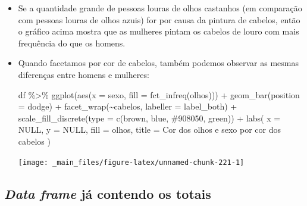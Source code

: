 \documentclass[
  11pt]{report}
\newenvironment{Shaded}{\begin{snugshade}}{\end{snugshade}}
\newcommand{\AttributeTok}[1]{\textcolor[rgb]{0.77,0.63,0.00}{#1}}
\newcommand{\ConstantTok}[1]{\textcolor[rgb]{0.00,0.00,0.00}{#1}}
\newcommand{\FunctionTok}[1]{\textcolor[rgb]{0.00,0.00,0.00}{#1}}
\newcommand{\NormalTok}[1]{#1}
\newcommand{\SpecialCharTok}[1]{\textcolor[rgb]{0.00,0.00,0.00}{#1}}
\newcommand{\StringTok}[1]{\textcolor[rgb]{0.31,0.60,0.02}{#1}}
\renewenvironment{Shaded}{
    \begin{mdframed}[%
      roundcorner=2pt,%
      innerleftmargin=5pt,%
      innerrightmargin=5pt,%
      topline=true,%
      leftline=true,%
      rightline=true,%
      bottomline=true,%
      linewidth=0.5pt,%
      linecolor=black!20,%
      backgroundcolor=black!2,%
      skipabove=2ex,%
      skipbelow=2.5ex%
    ]%
  }
  {
    \end{mdframed}
  }
\begin{document}
\begin{itemize}
\item
  Se a quantidade grande de pessoas louras de olhos castanhos (em comparação com pessoas louras de olhos azuis) for por causa da pintura de cabelos, então o gráfico acima mostra que as mulheres pintam os cabelos de louro com mais frequência do que os homens.
\item
  Quando facetamos por cor de cabelos, também podemos observar as mesmas diferenças entre homens e mulheres:

\begin{Shaded}
\begin{Highlighting}[]
\NormalTok{df }\SpecialCharTok{\%\textgreater{}\%} 
  \FunctionTok{ggplot}\NormalTok{(}\FunctionTok{aes}\NormalTok{(}\AttributeTok{x =}\NormalTok{ sexo, }\AttributeTok{fill =} \FunctionTok{fct\_infreq}\NormalTok{(olhos))) }\SpecialCharTok{+}
    \FunctionTok{geom\_bar}\NormalTok{(}\AttributeTok{position =} \StringTok{\textquotesingle{}dodge\textquotesingle{}}\NormalTok{) }\SpecialCharTok{+}
    \FunctionTok{facet\_wrap}\NormalTok{(}\SpecialCharTok{\textasciitilde{}}\NormalTok{cabelos, }\AttributeTok{labeller =}\NormalTok{ label\_both) }\SpecialCharTok{+}
    \FunctionTok{scale\_fill\_discrete}\NormalTok{(}\AttributeTok{type =} \FunctionTok{c}\NormalTok{(}\StringTok{\textquotesingle{}brown\textquotesingle{}}\NormalTok{, }\StringTok{\textquotesingle{}blue\textquotesingle{}}\NormalTok{, }\StringTok{\textquotesingle{}\#908050\textquotesingle{}}\NormalTok{, }\StringTok{\textquotesingle{}green\textquotesingle{}}\NormalTok{)) }\SpecialCharTok{+}
    \FunctionTok{labs}\NormalTok{(}
      \AttributeTok{x =} \ConstantTok{NULL}\NormalTok{,}
      \AttributeTok{y =} \ConstantTok{NULL}\NormalTok{,}
      \AttributeTok{fill =} \StringTok{\textquotesingle{}olhos\textquotesingle{}}\NormalTok{,}
      \AttributeTok{title =} \StringTok{\textquotesingle{}Cor dos olhos e sexo por cor dos cabelos\textquotesingle{}}
\NormalTok{    )}
\end{Highlighting}
\end{Shaded}

  \begin{center}\texttt{[image: \_main\_files/figure-latex/unnamed-chunk-221-1]} \end{center}
\end{itemize}

\hypertarget{data-frame-juxe1-contendo-os-totais}{%
\subsection{\texorpdfstring{\emph{Data frame} já contendo os totais}{Data frame já contendo os totais}}\label{data-frame-juxe1-contendo-os-totais}}
\end{document}

